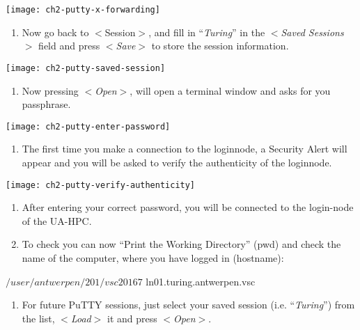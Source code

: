   \texttt{[image: ch2-putty-x-forwarding]}

  \begin{enumerate}
    \item  Now go back to $<$Session$>$, and fill in ``\textit{Turing}'' in the
      $<$\textit{Saved Sessions}$>$ field and press $<$\textit{Save}$>$ to
      store the session information.
  \end{enumerate}

  \texttt{[image: ch2-putty-saved-session]}

  \begin{enumerate}
    \item  Now pressing $<$\textit{Open}$>$, will open a terminal window and
      asks for you passphrase.
  \end{enumerate}

  \texttt{[image: ch2-putty-enter-password]}

  \begin{enumerate}
    \item  The first time you make a connection to the loginnode, a Security
      Alert will appear and you will be asked to verify the authenticity of the
      loginnode.
  \end{enumerate}

  \texttt{[image: ch2-putty-verify-authenticity]}

  \begin{enumerate}
    \item  After entering your correct password, you will be connected to the
      login-node of the UA-HPC.
    \item  To check you can now ``Print the Working Directory'' (pwd) and check
      the name of the computer, where you have logged in (hostname):
  \end{enumerate}

  \begin{prompt}
  $ %
  /user/antwerpen/201/vsc20167
  $ %
  ln01.turing.antwerpen.vsc
  \end{prompt}

  \begin{enumerate}
    \item  For future PuTTY sessions, just select your saved session (i.e.
      ``\textit{Turing}'') from the list, $<$\textit{Load}$>$ it and press
      $<$\textit{Open}$>$.
  \end{enumerate}

